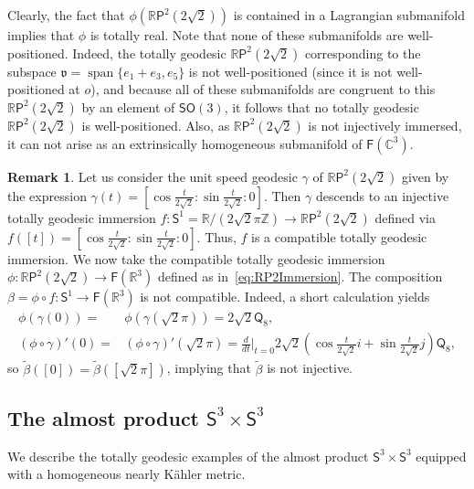 \documentclass[11pt,a4paper,final]{amsart}
\newcommand{\s}{\mathsf}
\newcommand{\g}{\mathfrak}
\newcommand{\R}{\mathbb{R}}
\newcommand{\C}{\mathbb{C}}
\newcommand{\spann}{\operatorname{span}}
\renewcommand{\tilde}{\widetilde}
\theoremstyle{definition}
\newtheorem{remark}[theorem]{Remark}
\begin{document}
Clearly, the fact that $\phi(\R\mathsf{P}^{2}(2\sqrt{2}))$ is contained in a Lagrangian submanifold implies that $\phi$ is totally real.
Note that none of these submanifolds are well-positioned.
Indeed, the totally geodesic $\R\s{P}^{2}(2\sqrt{2})$ corresponding to the subspace $\g{v}=\spann\{e_{1}+e_{3},e_{5}\}$ is not well-positioned (since it is not well-positioned at $o$), and because all of these submanifolds are congruent to this $\R\s{P}^{2}(2\sqrt{2})$ by an element of $\s{SO}(3)$, it follows that no totally geodesic $\R\s{P}^{2}(2\sqrt{2})$ is well-positioned.	
Also, as $\R\s{P}^{2}(2\sqrt{2})$ is not injectively immersed, it can not arise as an extrinsically homogeneous submanifold of $\s{F}(\C^{3})$.

\begin{remark}\label{remark:CompositionCompatibleImmersions}
	Let us consider the unit speed geodesic $\gamma$ of $\R\s{P}^{2}(2\sqrt{2})$ given by the expression $\gamma(t)=\left[\cos \frac{t}{2\sqrt{2}}: \sin \frac{t}{2\sqrt{2}} :0\right]$.
	Then $\gamma$ descends to an injective totally geodesic immersion $f\colon \s{S}^{1}=\R/(2\sqrt{2}\pi\mathbb{Z})\to\R\s{P}^{2}(2\sqrt{2})$ defined via $f([t])=\left[\cos \frac{t}{2\sqrt{2}} : \sin \frac{t}{2\sqrt{2}} : 0\right]$. Thus, $f$ is a compatible totally geodesic immersion.
	We now take the compatible totally geodesic immersion $\phi\colon \R\s{P}^{2}(2\sqrt{2})\to\s{F}(\R^{3})$ defined as in~\eqref{eq:RP2Immersion}.
	The composition $\beta=\phi\circ f\colon \s{S}^{1}\to \s{F}(\R^{3})$ is not compatible.
	Indeed, a short calculation yields
	\[
		\begin{aligned}
		\phi(\gamma(0))=&{}\phi(\gamma(\sqrt{2}\pi))=2\sqrt{2}\s{Q}_{8}, \\
		(\phi\circ\gamma)'(0)=&{}(\phi\circ\gamma)'(\sqrt{2}\pi)=\frac{d}{dt}\bigg\vert_{t=0}2\sqrt{2}\left(\cos \frac{t}{2\sqrt{2}} i + \sin \frac{t}{2\sqrt{2}} j\right)\s{Q}_{8},
		\end{aligned}
	\]
	so $\tilde{\beta}([0])=\tilde{\beta}([\sqrt{2}\pi])$, implying that $\tilde{\beta}$ is not injective.
\end{remark}

\subsection{The almost product $\mathsf{S}^{3}\times\mathsf{S}^{3}$}\label{subsec:exs3s3}We describe the totally geodesic examples of the almost product $\s{S}^3\times \s{S}^3$ equipped with a homogeneous nearly Kähler metric.
	
\end{document}
